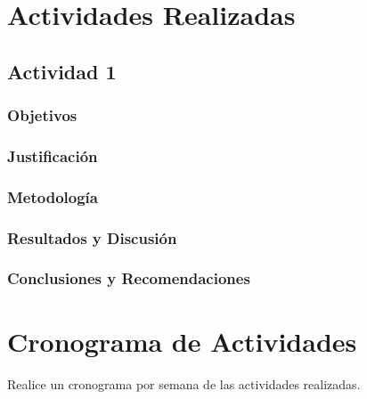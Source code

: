 \documentclass{article}
\begin{document}
\section{Actividades Realizadas}
\subsection{Actividad 1}
\subsubsection{Objetivos}
\subsubsection{Justificación}
\subsubsection{Metodología}
\subsubsection{Resultados y Discusión}
\subsubsection{Conclusiones y Recomendaciones}


\section{Cronograma de Actividades}
Realice un cronograma por semana de las actividades realizadas.
\end{document}

